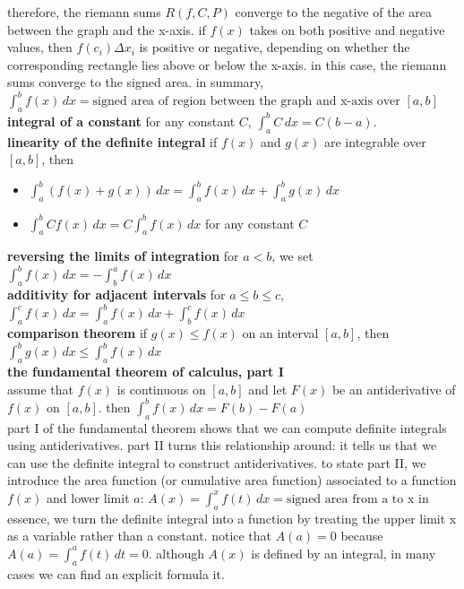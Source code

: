 \documentclass{article}
\begin{document}
therefore, the riemann sums $R(f, C, P)$ converge to the negative of the area between the graph and the x-axis. if $f(x)$ takes on both positive and negative values, then $f(c_i)\Delta x_i$ is positive or negative, depending on whether the corresponding rectangle lies above or below the x-axis. in this case, the riemann sums converge to the signed area. in summary,\\
$\int_{a}^{b}f(x)\, dx = \text{signed area of region between the graph and x-axis over } [a, b]$\\

\textbf{integral of a constant} for any constant $C$, $\int_{a}^{b}C\,dx = C(b - a)$.\\

\textbf{linearity of the definite integral} if $f(x)$ and $g(x)$ are integrable over $[a, b]$, then
	\begin{itemize}
		\item $\int_{a}^{b}(f(x) + g(x))\,dx = \int_{a}^{b}f(x)\,dx + \int_{a}^{b}g(x)\,dx$
		\item $\int_{a}^{b}Cf(x)\,dx = C\int_{a}^{b}f(x)\,dx$ for any constant $C$
	\end{itemize}

\textbf{reversing the limits of integration} for $a < b$, we set $\int_{a}^{b}f(x)\,dx = -\int_{b}^{a}f(x)\,dx$\\

\textbf{additivity for adjacent intervals} for $a \leq b \leq c$,\\
$ \int_{a}^{c}f(x)\,dx  = \int_{a}^{b}f(x)\,dx + \int_{b}^{c}f(x)\,dx$\\

\textbf{comparison theorem} if $g(x) \leq f(x)$ on an interval $[a, b]$, then\\
$\int_{a}^{b}g(x)\,dx \leq \int_{a}^{b}f(x)\,dx$\\

\textbf{the fundamental theorem of calculus, part I}\\
assume that $f(x)$ is continuous on $[a, b]$ and let $F(x)$ be an antiderivative of $f(x)$ on $[a, b]$. then $\int_{a}^{b}f(x)\,dx = F(b) - F(a)$\\

part I of the fundamental theorem shows that we can compute definite integrals using antiderivatives. part II turns this relationship around: it tells us that we can use the definite integral to construct antiderivatives. to state part II, we introduce the area function (or cumulative area function) associated to a function $f(x)$ and lower limit $a$: $A(x) = \int_{a}^{x}f(t)\, dx = \text{signed area from a to x}$ in essence, we turn the definite integral into a function by treating the upper limit x as a variable rather than a constant. notice that $A(a) = 0$ because $A(a) = \int_{a}^{a}f(t)\,dt = 0$. although $A(x)$ is defined by an integral, in many cases we can find an explicit formula it.\\
\end{document}
